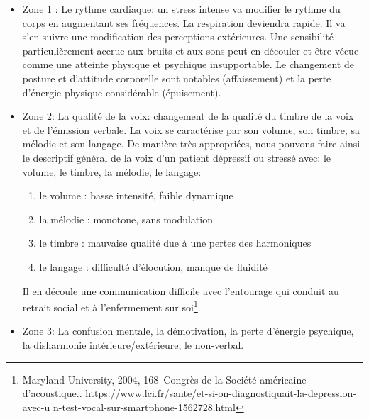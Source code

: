 \begin{itemize}
  	\item Zone 1 :  Le rythme cardiaque: un stress intense va modifier le rythme
  du corps en augmentant ses fréquences. La respiration deviendra
  rapide. Il va s'en suivre une modification des perceptions
  extérieures. Une sensibilité particulièrement accrue aux bruits et
  aux sons peut en découler et être vécue comme une
  atteinte physique et psychique insupportable.
  Le changement de posture et d'attitude corporelle sont
notables (affaissement) et la perte d'énergie physique considérable (épuisement).
	\item Zone 2: La qualité de la voix: changement de la qualité du timbre de la
 voix et de l'émission verbale.	
  La voix se caractérise par son volume, son timbre, sa mélodie et son langage. 
	De manière très appropriées, nous pouvons faire ainsi le
        descriptif général de la voix d'un patient dépressif ou
        stressé avec: le volume, le timbre, la
        mélodie, le langage: 
 	\begin{enumerate}
 		\item le volume : basse intensité, faible dynamique
 		\item la mélodie : monotone, sans modulation
 		\item le timbre : mauvaise qualité due à une pertes des harmoniques
 		\item le langage : difficulté d'élocution, manque de fluidité
 	\end{enumerate}
        Il en découle une communication difficile avec l'entourage qui  conduit au retrait social et à l'enfermement sur soi\footnote{Maryland University, 2004, 168\ieme\ Congrès de la Société
américaine d'acoustique.\autocite{le_service_metronews}. https://www.lci.fr/sante/et-si-on-diagnostiquait-la-depression-avec-u
n-test-vocal-sur-smartphone-1562728.html}.
        
	\item Zone 3: La confusion mentale, la démotivation, la perte d'énergie
psychique, la disharmonie intérieure/extérieure, le non-verbal.
\end{itemize}

